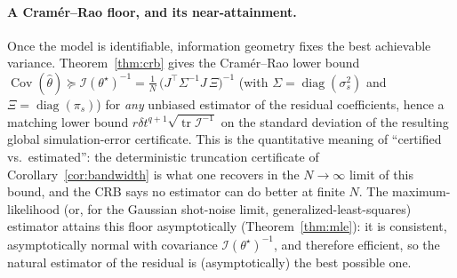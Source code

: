 \documentclass[aps,prresearch,reprint,superscriptaddress,nofootinbib,amsmath,amssymb]{revtex4-2}
\newcommand{\dt}{\delta t}
\begin{document}
\paragraph{A Cram\'er--Rao floor, and its near-attainment.} Once the model is identifiable, information geometry fixes the best achievable variance. Theorem~\ref{thm:crb} gives the Cram\'er--Rao lower bound $\operatorname{Cov}(\hat\theta)\succeq\mathcal{I}(\theta^\star)^{-1}=\tfrac1N\,\bigl(J^\top\Sigma^{-1}J\,\Xi\bigr)^{-1}$ (with $\Sigma=\operatorname{diag}(\sigma_s^2)$ and $\Xi=\operatorname{diag}(\pi_s)$) for \emph{any} unbiased estimator of the residual coefficients, hence a matching lower bound $r\dt^{q+1}\!\sqrt{\operatorname{tr}\mathcal{I}^{-1}}$ on the standard deviation of the resulting global simulation-error certificate. This is the quantitative meaning of ``certified vs.\ estimated'': the deterministic truncation certificate of Corollary~\ref{cor:bandwidth} is what one recovers in the $N\to\infty$ limit of this bound, and the CRB says no estimator can do better at finite $N$. The maximum-likelihood (or, for the Gaussian shot-noise limit, generalized-least-squares) estimator attains this floor asymptotically (Theorem~\ref{thm:mle}): it is consistent, asymptotically normal with covariance $\mathcal{I}(\theta^\star)^{-1}$, and therefore efficient, so the natural estimator of the residual is (asymptotically) the best possible one.
\end{document}
